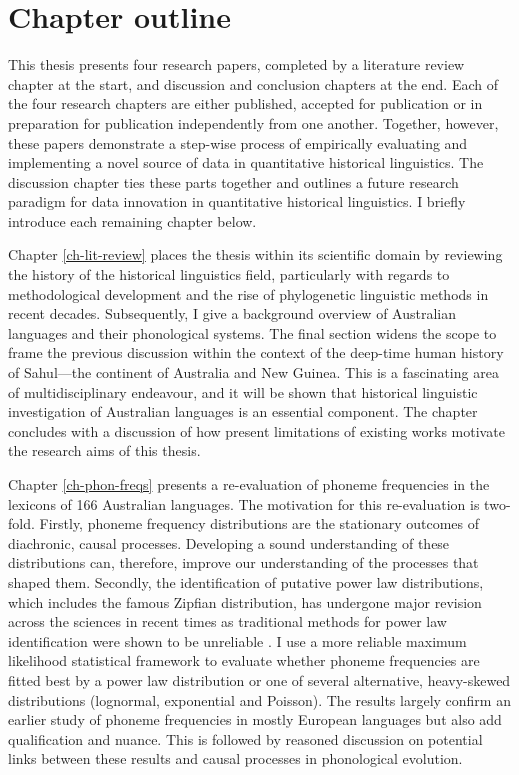 \hypertarget{intro-chapter-outline}{%
\section{Chapter outline}\label{intro-chapter-outline}}

This thesis presents four research papers, completed by a literature review chapter at the start, and discussion and conclusion chapters at the end. Each of the four research chapters are either published, accepted for publication or in preparation for publication independently from one another. Together, however, these papers demonstrate a step-wise process of empirically evaluating and implementing a novel source of data in quantitative historical linguistics. The discussion chapter ties these parts together and outlines a future research paradigm for data innovation in quantitative historical linguistics. I briefly introduce each remaining chapter below.

Chapter \ref{ch-lit-review} places the thesis within its scientific domain by reviewing the history of the historical linguistics field, particularly with regards to methodological development and the rise of phylogenetic linguistic methods in recent decades. Subsequently, I give a background overview of Australian languages and their phonological systems. The final section widens the scope to frame the previous discussion within the context of the deep-time human history of Sahul---the continent of Australia and New Guinea. This is a fascinating area of multidisciplinary endeavour, and it will be shown that historical linguistic investigation of Australian languages is an essential component. The chapter concludes with a discussion of how present limitations of existing works motivate the research aims of this thesis.

Chapter \ref{ch-phon-freqs} presents a re-evaluation of phoneme frequencies in the lexicons of 166 Australian languages. The motivation for this re-evaluation is two-fold. Firstly, phoneme frequency distributions are the stationary outcomes of diachronic, causal processes. Developing a sound understanding of these distributions can, therefore, improve our understanding of the processes that shaped them. Secondly, the identification of putative power law distributions, which includes the famous Zipfian distribution, has undergone major revision across the sciences in recent times as traditional methods for power law identification were shown to be unreliable \autocite{clauset_power-law_2009}. I use a more reliable maximum likelihood statistical framework to evaluate whether phoneme frequencies are fitted best by a power law distribution or one of several alternative, heavy-skewed distributions (lognormal, exponential and Poisson). The results largely confirm an earlier study of phoneme frequencies in mostly European languages \autocite{tambovtsev_phoneme_2007} but also add qualification and nuance. This is followed by reasoned discussion on potential links between these results and causal processes in phonological evolution.

